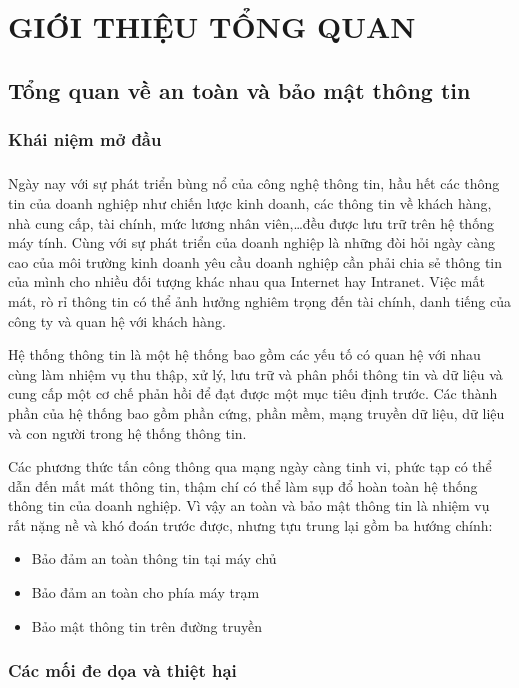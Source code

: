 \chapter{GIỚI THIỆU TỔNG QUAN}
\section{Tổng quan về an toàn và bảo mật thông tin}
\subsection{Khái niệm mở đầu}
\paragraph{}
Ngày nay với sự phát triển bùng nổ của công nghệ thông tin, hầu hết các thông tin của doanh nghiệp như chiến lược kinh doanh, các thông tin về khách hàng, nhà cung cấp, tài chính, mức lương nhân viên,…đều được lưu trữ trên hệ thống máy tính. Cùng với sự phát triển của doanh nghiệp là những đòi hỏi ngày càng cao của môi trường kinh doanh yêu cầu doanh nghiệp cần phải chia sẻ thông tin của mình cho nhiều đối tượng khác nhau qua Internet hay Intranet. Việc mất mát, rò rỉ thông tin có thể ảnh hưởng nghiêm trọng đến tài chính, danh tiếng của công ty và quan hệ với khách hàng. 

Hệ thống thông tin là một hệ thống bao gồm các yếu tố có quan hệ với nhau cùng làm nhiệm vụ thu thập, xử lý, lưu trữ và phân phối thông tin và dữ liệu và cung cấp một cơ chế phản hồi để đạt được một mục tiêu định trước. Các thành phần của hệ thống bao gồm phần cứng, phần mềm, mạng truyền dữ liệu, dữ liệu và con người trong hệ thống thông tin.

Các phương thức tấn công thông qua mạng ngày càng tinh vi, phức tạp có thể dẫn đến mất mát thông tin, thậm chí có thể làm sụp đổ hoàn toàn hệ thống thông tin của doanh nghiệp. Vì vậy an toàn và bảo mật thông tin là nhiệm vụ rất nặng nề và khó đoán trước được, nhưng tựu trung lại gồm ba hướng chính: 
\begin{itemize}
    \item Bảo đảm an toàn thông tin tại máy chủ 
    \item Bảo đảm an toàn cho phía máy trạm 
    \item Bảo mật thông tin trên đường truyền 
\end{itemize}

\subsection{Các mối đe dọa và thiệt hại}
